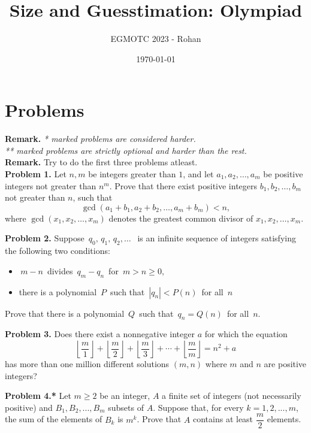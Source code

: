 \documentclass[12pt]{article}
\title{Size and Guesstimation: Olympiad}
\author{EGMOTC 2023 - Rohan}
\date{\today}
\begin{document}
\maketitle

\newcommand{\localtextbulletone}{\textcolor{black}{\raisebox{.45ex}{\rule{.6ex}{.6ex}}}}
\renewcommand{\labelitemi}{\localtextbulletone}

\section*{Problems}
\vspace{1cm}
\thispagestyle{empty}

\textbf{Remark.} \textit{* marked problems are considered harder.\\ ** marked problems are strictly optional and harder than the rest.\\}
\textbf{Remark.} Try to do the first three problems atleast.\\

\textbf{Problem 1.} Let $n, m$ be integers greater than $1$, and let $a_1, a_2, \dots, a_m$ be positive integers not greater than $n^m$. Prove that there exist positive integers $b_1, b_2, \dots, b_m$ not greater than $n$, such that\[ \gcd(a_1 + b_1, a_2 + b_2, \dots, a_m + b_m) < n, \]where $\gcd(x_1, x_2, \dots, x_m)$ denotes the greatest common divisor of $x_1, x_2, \dots, x_m$.

\textbf{Problem 2.} Suppose $\, q_{0}, \, q_{1}, \, q_{2}, \ldots \; \,$ is an infinite sequence of integers satisfying the following two conditions:
\begin{itemize}
    \item $\, m-n \,$ divides $\, q_{m}-q_{n}\,$ for $\, m > n \geq 0,$
    \item there is a polynomial $\, P \,$ such that $\, |q_{n}| < P(n) \,$ for all $\, n$
\end{itemize}

Prove that there is a polynomial $\, Q \,$ such that $\, q_{n}= Q(n) \,$ for all $\, n$.

\textbf{Problem 3.} Does there exist a nonnegative integer $a$ for which the equation
\[\left\lfloor\frac{m}{1}\right\rfloor + \left\lfloor\frac{m}{2}\right\rfloor + \left\lfloor\frac{m}{3}\right\rfloor + \cdots + \left\lfloor\frac{m}{m}\right\rfloor = n^2 + a\]has more than one million different solutions $(m, n)$ where $m$ and $n$ are positive integers?

\textbf{Problem 4.*} Let $m\ge 2$ be an integer, $A$ a finite set of integers (not necessarily positive) and $B_1,B_2,...,B_m$ subsets of $A$. Suppose that, for every $k=1,2,...,m$, the sum of the elements of $B_k$ is $m^k$. Prove that $A$ contains at least $\dfrac{m}{2}$ elements.
\end{document}
